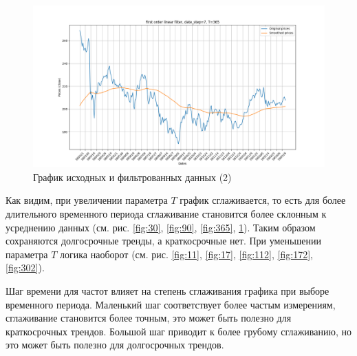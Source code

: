 \documentclass[a4paper, 12pt]{article}
\begin{document}
    \begin{figure}[H]
        \centering
        \includegraphics[scale=0.35]{2_365.png}
        \captionsetup{skip=0pt}
        \caption{График исходных и фильтрованных данных (2)}
        \label{fig:3652}
    \end{figure}


    Как видим, при увеличении параметра $T$ график сглаживается, то есть для более длительного временного периода
    сглаживание становится более склонным к усреднению данных (см. рис. \ref{fig:30}, \ref{fig:90}, \ref{fig:365},
    \ref{fig:3652}). Таким образом сохраняются долгосрочные тренды, а краткосрочные нет. При уменьшении параметра $T$ логика наоборот
    (см. рис. \ref{fig:11}, \ref{fig:17}, \ref{fig:112}, \ref{fig:172}, \ref{fig:302}).


    Шаг времени для частот влияет на степень сглаживания графика при выборе временного периода. Маленький шаг соответствует
    более частым измерениям, сглаживание становится более точным, это может быть полезно для краткосрочных трендов.
    Большой шаг приводит к более грубому сглаживанию, но это может быть полезно для долгосрочных трендов.
\end{document}
